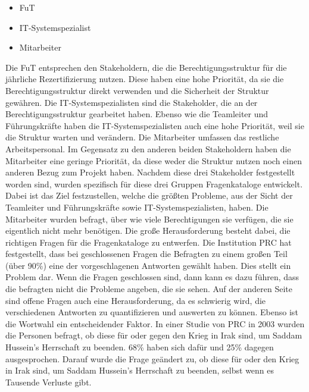\begin{itemize}
	\item \ac{FuT}
	\item IT-Systemspezialist
	\item Mitarbeiter
\end{itemize}
Die \ac{FuT} entsprechen den Stakeholdern, die die Berechtigungsstruktur für die jährliche Rezertifizierung nutzen.
Diese haben eine hohe Priorität, da sie die Berechtigungsstruktur direkt verwenden und die Sicherheit der Struktur gewähren.
\newline
Die IT-Systemspezialisten sind die Stakeholder, die an der Berechtigungsstruktur gearbeitet haben.
Ebenso wie die Teamleiter und Führungskräfte haben die IT-Systemspezialisten auch eine hohe Priorität, weil sie die Struktur warten und verändern.
\newline
Die Mitarbeiter umfassen das restliche Arbeitspersonal.
Im Gegensatz zu den anderen beiden Stakeholdern haben die Mitarbeiter eine geringe Priorität, da diese weder die Struktur nutzen noch einen anderen Bezug zum Projekt haben.
\newline
\newline
Nachdem diese drei Stakeholder festgestellt worden sind, wurden spezifisch für diese drei Gruppen Fragenkataloge entwickelt.
Dabei ist das Ziel festzustellen, welche die größten Probleme, aus der Sicht der Teamleiter und Führungskräfte sowie IT-Systemspezialisten, haben.
Die Mitarbeiter wurden befragt, über wie viele Berechtigungen sie verfügen, die sie eigentlich nicht mehr benötigen.
Die große Herausforderung besteht dabei, die richtigen Fragen für die Fragenkataloge zu entwerfen.
Die Institution \ac{PRC} hat festgestellt, dass bei geschlossenen Fragen die Befragten zu einem großen Teil (über 90\%) eine der vorgeschlagenen Antworten gewählt haben. \cite{Survey}
Dies stellt ein Problem dar.
Wenn die Fragen geschlossen sind, dann kann es dazu führen, dass die befragten nicht die Probleme angeben, die sie sehen.
Auf der anderen Seite sind offene Fragen auch eine Herausforderung, da es schwierig wird, die verschiedenen Antworten zu quantifizieren und auswerten zu können.
Ebenso ist die Wortwahl ein entscheidender Faktor.
In einer Studie von \ac{PRC} in 2003 wurden die Personen befragt, ob diese für oder gegen den Krieg in Irak sind, um Saddam Hussein's Herrschaft zu beenden.
68\% haben sich dafür und 25\% dagegen ausgesprochen.
Darauf wurde die Frage geändert zu, ob diese für oder den Krieg in Irak sind, um Saddam Hussein's Herrschaft zu beenden, selbst wenn es Tausende Verluste gibt.
